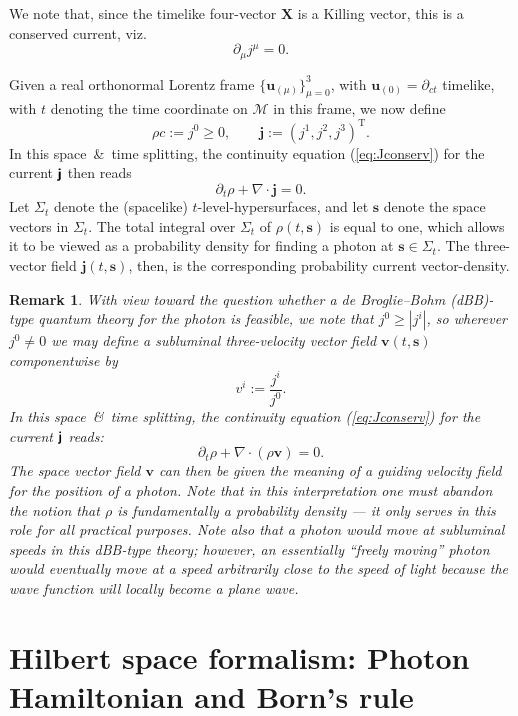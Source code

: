 \documentclass[11pt]{article}
\theoremstyle{definition}
\newtheorem{rem}[thm]{Remark}
\newcommand{\refeq}[1]{(\ref{#1})}
\newcommand{\vect}[1] {\boldsymbol{{ #1}} }
\newcommand{\tenseur}[1]{{\textbf{\textsf{#1}}}}
\newcommand{\bMj}{{\tenseur{j}}}
\newcommand{\jV}{{\vect{j}}}		%
\newcommand{\sV}{{\vect{s}}}            %
\newcommand{\vV}{{\vect{v}}}            %
\numberwithin{equation}{section}
\newcommand{\bu}{\mathbf{u}}
\newcommand{\bX}{\mathbf{X}}
\newcommand{\beq}{\begin{equation}}
\newcommand{\eeq}{\end{equation}}
\newcommand{\p}{\partial}
\newcommand{\cM}{{\mathcal M}}
\newcommand{\Si}{\Sigma}
\newcommand{\nab}{\nabla}
\begin{document}
 We note that, since the timelike four-vector $\bX$ is a Killing vector, this is a conserved current, viz.
\beq \label{eq:Jconserv}
\p_\mu j^\mu = 0.
\eeq

 Given a real orthonormal Lorentz frame $\{\bu_{(\mu)}\}_{\mu = 0}^3$, with $\bu_{(0)}=\p_{ct}$ timelike, with
$t$ denoting the time coordinate on $\cM$ in this frame, we now define 
\beq \label{rhoANDjV}
\rho c:= j^0 \geq 0,\qquad \jV := (j^1,j^2,j^3)^{\mathrm{T}}.
\eeq
In this space\ \&\ time splitting, the continuity equation \refeq{eq:Jconserv} for the current $\bMj$ then reads 
\beq \label{eq:PROBcontinuityEQ}
\p_t \rho + \nab \cdot \jV = 0.
\eeq
 Let $\Si_t$ denote the (spacelike) $t$-level-hypersurfaces, and let $\sV$ denote the space vectors in $\Si_t$. 
  The total integral over $\Si_t$ of $\rho(t,\sV)$ is equal to one, which allows it to be viewed as a probability density
for finding a photon at $\sV\in\Si_t$.
  The three-vector field $\jV(t,\sV)$, then, is the corresponding probability current vector-density. 

\begin{rem}
\textit{With view toward the question whether a de Broglie--Bohm (dBB)-type quantum theory for the photon is feasible,
we note that $j^0 \geq |j^i|$, so wherever $j^0\neq 0$ we may define a subluminal three-velocity vector field $\vV(t,\sV)$ componentwise by
\beq 
 v^i := \frac{j^i}{j^0}.
\eeq
  In this space\ \&\ time splitting, the continuity equation \refeq{eq:Jconserv} for the current $\bMj$ reads:  
\beq \label{eq:PROBcontinuityEQsplit}
\p_t \rho + \nab \cdot ( \rho \vV) = 0.
\eeq
  The space vector field $\vV$ can then be given the meaning of a {\em guiding velocity field} for the position of a photon.
  Note that in this interpretation one {\em must} abandon the notion that $\rho$ is fundamentally a probability density --- 
  it {\em only serves in this role for all practical purposes}.
 Note also that a photon would move at subluminal speeds in this dBB-type theory; however, an essentially ``freely moving'' photon
would eventually move at a speed arbitrarily close to the speed of light because the wave function will locally become a plane
wave.}
\end{rem}
%
\section{Hilbert space formalism: Photon Hamiltonian and Born's rule}\label{sec:HilbertBorn}\vspace{-5pt}
%
\end{document}
